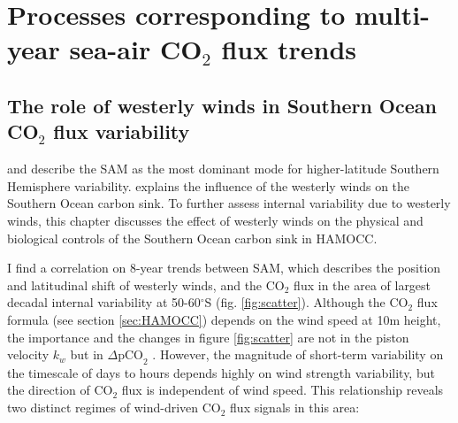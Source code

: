 \chapter{Processes corresponding to multi-year sea-air CO$_2$ flux trends}
\label{ch:trends}

\section{The role of westerly winds in Southern Ocean CO$_2$ flux variability}

\cite{Thompson2000} and \cite{Hall2002} describe the \ac{SAM} as the most dominant mode for higher-latitude Southern Hemisphere variability. \cite{Lovenduski2007} explains the influence of the westerly winds on the Southern Ocean carbon sink. To further assess internal variability due to westerly winds, this chapter discusses the effect of westerly winds on the physical and biological controls of the Southern Ocean carbon sink in \acs{HAMOCC}.\newline

I find a correlation on 8-year trends between \acs{SAM}, which describes the position and latitudinal shift of westerly winds, and the CO$_2$ flux in the area of largest decadal internal variability at 50-60$^\circ$S (fig. \ref{fig:scatter}). Although the CO$_2$ flux formula (see section \ref{sec:HAMOCC}) depends on the wind speed at 10m height, the importance and the changes in figure \ref{fig:scatter} are not in the piston velocity $k_w$ but in $\Delta \text{pCO}_2$ \citep{Lovenduski2015}. However, the magnitude of short-term variability on the timescale of days to hours depends highly on wind strength variability, but the direction of CO$_2$ flux is independent of wind speed. This relationship reveals two distinct regimes of wind-driven CO$_2$ flux signals in this area: 

